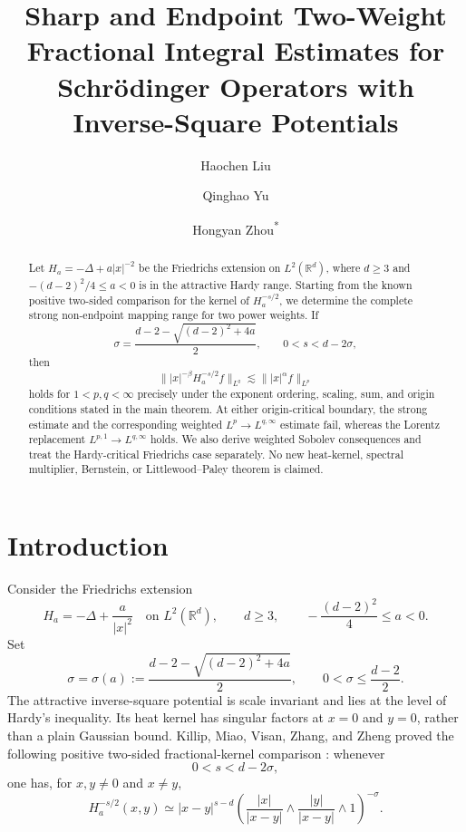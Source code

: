 \documentclass[11pt]{amsart}
\title[Two-Weight Fractional Integrals for Inverse-Square Operators]
{Sharp and Endpoint Two-Weight Fractional Integral Estimates for Schr\"odinger Operators with Inverse-Square Potentials}
\author{Haochen Liu}
\author{Qinghao Yu}
\author{Hongyan Zhou\texorpdfstring{\textsuperscript{*}}{*}}
\date{}
\numberwithin{equation}{section}
\theoremstyle{plain}
\theoremstyle{definition}
\theoremstyle{remark}
\newcommand{\RR}{\mathbb{R}}
\newcommand{\Ha}{H_a}
\begin{document}
\begin{abstract}
Let $\Ha=-\Delta+a|x|^{-2}$ be the Friedrichs extension on $L^2(\RR^d)$, where $d\ge 3$ and $-(d-2)^2/4\le a<0$ is in the attractive Hardy range. Starting from the known positive two-sided comparison for the kernel of $\Ha^{-s/2}$, we determine the complete strong non-endpoint mapping range for two power weights. If
\[
 \sigma=\frac{d-2-\sqrt{(d-2)^2+4a}}{2},
 \qquad 0<s<d-2\sigma,
\]
then
\[
 \bigl\||x|^{-\beta}\Ha^{-s/2}f\bigr\|_{L^q}
 \lesssim
 \bigl\||x|^\alpha f\bigr\|_{L^p}
\]
holds for $1<p,q<\infty$ precisely under the exponent ordering, scaling, sum, and origin conditions stated in the main theorem. At either origin-critical boundary, the strong estimate and the corresponding weighted $L^p\to L^{q,\infty}$ estimate fail, whereas the Lorentz replacement $L^{p,1}\to L^{q,\infty}$ holds. We also derive weighted Sobolev consequences and treat the Hardy-critical Friedrichs case separately. No new heat-kernel, spectral multiplier, Bernstein, or Littlewood--Paley theorem is claimed.
\end{abstract}

\maketitle

\section{Introduction}
\label{sec:introduction}

Consider the Friedrichs extension
\begin{equation}
 \Ha=-\Delta+\frac{a}{|x|^2}
 \quad\text{on }L^2(\RR^d),
 \qquad d\ge3,
 \qquad -\frac{(d-2)^2}{4}\le a<0.
 \label{eq:operator}
\end{equation}
Set
\begin{equation}
 \sigma=\sigma(a)
 :=\frac{d-2-\sqrt{(d-2)^2+4a}}{2},
 \qquad 0<\sigma\le\frac{d-2}{2}.
 \label{eq:sigma}
\end{equation}
The attractive inverse-square potential is scale invariant and lies at the level of Hardy's inequality. Its heat kernel has singular factors at $x=0$ and $y=0$, rather than a plain Gaussian bound. Killip, Miao, Visan, Zhang, and Zheng proved the following positive two-sided fractional-kernel comparison \cite[Lemma~2.2]{KillipEtAl2018}: whenever
\begin{equation}
 0<s<d-2\sigma,
 \label{eq:s-range}
\end{equation}
one has, for $x,y\ne0$ and $x\ne y$,
\begin{equation}
 \Ha^{-s/2}(x,y)
 \simeq
 |x-y|^{s-d}
 \left(
 \frac{|x|}{|x-y|}\wedge
 \frac{|y|}{|x-y|}\wedge1
 \right)^{-\sigma}.
 \label{eq:kmmvzz-kernel}
\end{equation}
\end{document}
